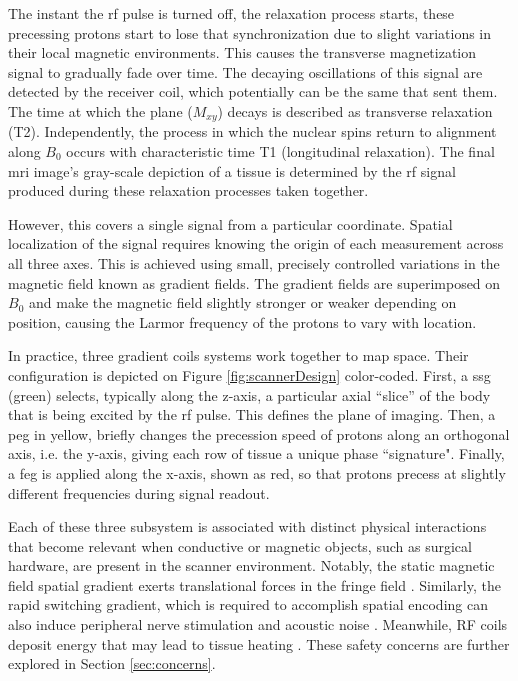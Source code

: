 The instant the \gls{rf} pulse is turned off, the relaxation process starts, these precessing protons start to lose that synchronization due to slight variations in their local magnetic environments. This causes the transverse magnetization signal to gradually fade over time. The decaying oscillations of this signal are detected by the receiver coil, which potentially can be the same that sent them. The time at which the plane ($M_{xy}$) decays is described as transverse relaxation (T2). Independently, the process in which the nuclear spins return to alignment along $B_0$ occurs with characteristic time T1 (longitudinal relaxation). The final \gls{mri} image's gray-scale depiction of a tissue is determined by the \gls{rf} signal produced during these relaxation processes taken together.  

However, this covers a single signal from a particular coordinate. Spatial localization of the signal requires knowing the origin of each measurement across all three axes. This is achieved using small, precisely controlled variations in the magnetic field known as gradient fields. The gradient fields are superimposed on $B_0$ and make the magnetic field slightly stronger or weaker depending on position, causing the Larmor frequency of the protons to vary with location.

In practice, three gradient coils systems work together to map space. Their configuration is depicted on Figure \ref{fig:scannerDesign} color-coded. First, a \gls{ssg} (green) selects, typically along the z-axis, a particular axial ``slice” of the body that is being excited by the \gls{rf} pulse. This defines the plane of imaging. Then, a \gls{peg} in yellow, briefly changes the precession speed of protons along an orthogonal axis, i.e. the y-axis, giving each row of tissue a unique phase ``signature". Finally, a \gls{feg} is applied along the x-axis, shown as red, so that protons precess at slightly different frequencies during signal readout. 

Each of these three subsystem is associated with distinct physical interactions that become relevant when conductive or magnetic objects, such as surgical hardware, are present in the scanner environment. Notably, the static magnetic field spatial gradient exerts translational forces in the fringe field \cite{mriquestions_dangerous_place}. Similarly, the rapid switching gradient, which is required to accomplish spatial encoding can also induce peripheral nerve stimulation and acoustic noise \cite{mriquestions_gradient_safety}. Meanwhile, RF coils deposit energy that may lead to tissue heating \cite{mriquestions_rf_safety}. These safety concerns are further explored in Section \ref{sec:concerns}.

